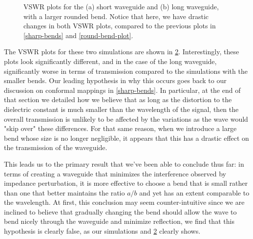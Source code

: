 \begin{figure}
\begin{subfigure}{0.4\textwidth}
		\caption{}
		\label{long-finitecond-bend-round-big}
	\end{subfigure}
	\caption{VSWR plots for the (a) short waveguide and (b) long waveguide, with a larger rounded bend.
	Notice that here, we have drastic changes in both VSWR plots, compared to the previous plots in
\cref{sharp-bends} and \cref{round-bend-plot}.}
	\label{round-bend-big}
\end{figure}

The VSWR plots for these two simulations are shown in \cref{round-bend-big}. Interestingly, these plots look
significantly different, and in the case of the long waveguide, significantly worse in terms of transmission
compared to the simulations with the smaller bends. Our leading hypothesis in why this occurs goes back to
our discussion on conformal mappings in \cref{sharp-bends}. In particular, at the end of that section we
detailed how we believe that as long as the distortion to the dielectric constant is much smaller than the
wavelength of the signal, then the overall transmission is unlikely to be affected by the variations as the
wave would "skip over" these differences. For that same reason, when we introduce a large bend whose size is
no longer negligible, it appears that this has a drastic effect on the transmission of the waveguide. 

This leads us to the primary result that we've been able to conclude thus far: in terms of creating a
waveguide that minimizes the interference observed by impedance perturbation, it is more effective to choose
a bend that is small rather than one that better maintains the ratio \( a / b \) and yet has an extent comparable
to the wavelength. At first, this conclusion may seem
counter-intuitive since we are inclined to believe that gradually changing the bend should allow the wave to
bend nicely through the waveguide and minimize reflection, we find that this hypothesis is clearly false, as
our simulations and \cref{round-bend-big} clearly shows.
 
  
 

 
  
